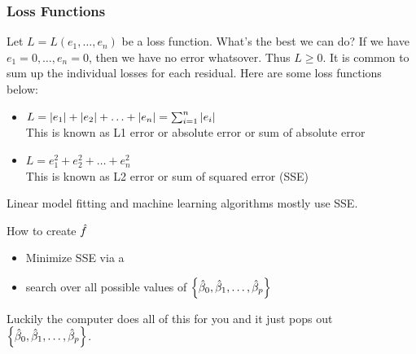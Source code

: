 \documentclass[handout]{beamer}
\begin{document}
\begin{frame}\frametitle{Loss Functions}

\small
Let $L = L(e_1, \ldots, e_n)$ be a loss function. What's the best we can do? If we have $e_1 = 0, \ldots, e_n = 0$, then we have no error whatsover. Thus $L \geq 0$. It is common to sum up the individual losses for each residual. Here are some loss functions below:

\begin{itemize}
\item $L = \left|e_1\right| + \left|e_2\right| + \ldots + \left|e_n\right| = \sum_{i=1}^n \left|e_i\right|$ \\
This is known as L1 error or absolute error or sum of absolute error
\item $L = e_1^2 + e_2^2 + \ldots + e_n^2$  \\
This is known as L2 error or sum of squared error (SSE)
\end{itemize}

Linear model fitting and machine learning algorithms mostly use SSE.

\begin{block}{How to create $\hat{f}$}
\begin{itemize}
\item Minimize SSE via a 
\item search over all possible values of $\left\{\hat{\beta}_0, \hat{\beta}_1,  \ldots, \hat{\beta}_p\right\}$
\end{itemize}
\end{block}

Luckily the computer does all of this for you and it just pops out  $\left\{\hat{\beta}_0, \hat{\beta}_1,  \ldots, \hat{\beta}_p\right\}$.
	
\end{frame}

\begin{frame}\frametitle{}

	
\end{frame}

\begin{frame}\frametitle{}

	
\end{frame}

\begin{frame}\frametitle{}

	
\end{frame}


%
%
%
%	
\end{document}
